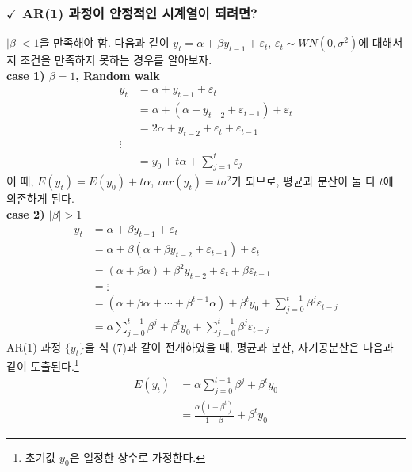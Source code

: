 \documentclass{article}
\begin{document}
\subsubsection*{$\checkmark$ AR(1) 과정이 안정적인 시계열이 되려면?}
$|\beta|<1$을 만족해야 함. 다음과 같이 $y_{t} = \alpha + \beta y_{t-1} + \varepsilon_t$, $\varepsilon_t \sim WN(0, \sigma^2)$에 대해서 저 조건을 만족하지 못하는 경우를 알아보자.\\
\textbf{case 1) $\beta = 1$, Random walk}\\
\begin{equation}
\begin{aligned}
y_{t} &= \alpha + y_{t-1} + \varepsilon_t\\
      &= \alpha + (\alpha + y_{t-2} + \varepsilon_{t-1}) + \varepsilon_t \\
      &= 2\alpha + y_{t-2} + \varepsilon_{t} + \varepsilon_{t-1}\\
      \vdots \\
      &= y_0 + t\alpha + \sum_{j=1}^{t}\varepsilon_j  
\end{aligned}  
\end{equation}
이 때, $E(y_t) = E(y_0) + t\alpha$, $var(y_t) = t\sigma^2$가 되므로, 평균과 분산이 둘 다 $t$에 의존하게 된다.\\
\textbf{case 2) $|\beta| > 1$}\\
\begin{equation}
\begin{aligned}
y_t &= \alpha + \beta y_{t-1} + \varepsilon_t\\
    &= \alpha + \beta(\alpha + \beta y_{t-2} + \varepsilon_{t-1}) + \varepsilon_t\\ 
    &= (\alpha + \beta\alpha) + \beta^{2}y_{t-2} + \varepsilon_{t} + \beta\varepsilon_{t-1}\\
    &= \vdots\\
    &= (\alpha + \beta\alpha + \cdots + \beta^{t-1}\alpha) + \beta^{t} y_{0} + \sum_{j=0}^{t-1}\beta^{j}\varepsilon_{t-j}\\
    &= \alpha\sum_{j=0}^{t-1}\beta^{j} + \beta^{t} y_{0} + \sum_{j=0}^{t-1}\beta^{j}\varepsilon_{t-j}
\end{aligned}  
\end{equation}
AR(1) 과정 $\{y_t\}$을 식 (7)과 같이 전개하였을 때, 평균과 분산, 자기공분산은 다음과 같이 도출된다.\footnote{초기값 $y_0$은 일정한 상수로 가정한다.}\\
\begin{equation}
\begin{aligned}
E(y_{t}) &= \alpha\sum_{j=0}^{t-1}\beta^{j} + \beta^{t} y_{0}\\
         &= \frac{\alpha(1-\beta^{t})}{1-\beta} + \beta^{t} y_{0}  
\end{aligned}    
\end{equation}
\end{document}
